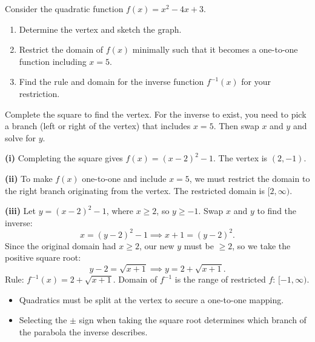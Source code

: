 
\begin{problem}
Consider the quadratic function $f(x) = x^2 - 4x + 3$.
\begin{enumerate}[label=(\roman*)]
\item Determine the vertex and sketch the graph.
\item Restrict the domain of $f(x)$ minimally such that it becomes a one-to-one function including $x=5$.
\item Find the rule and domain for the inverse function $f^{-1}(x)$ for your restriction.
\end{enumerate}
\end{problem}

\begin{hint}
Complete the square to find the vertex. For the inverse to exist, you need to pick a branch (left or right of the vertex) that includes $x=5$. Then swap $x$ and $y$ and solve for $y$.
\end{hint}

\begin{solution}
\textbf{(i)} Completing the square gives $f(x) = (x-2)^2 - 1$. The vertex is $(2, -1)$.

\textbf{(ii)} To make $f(x)$ one-to-one and include $x=5$, we must restrict the domain to the right branch originating from the vertex. The restricted domain is $[2, \infty)$.

\textbf{(iii)} Let $y = (x-2)^2 - 1$, where $x \ge 2$, so $y \ge -1$.
Swap $x$ and $y$ to find the inverse:
\[ x = (y-2)^2 - 1 \implies x + 1 = (y-2)^2. \]
Since the original domain had $x \ge 2$, our new $y$ must be $\ge 2$, so we take the positive square root:
\[ y-2 = \sqrt{x+1} \implies y = 2 + \sqrt{x+1}. \]
Rule: $\boxed{f^{-1}(x) = 2 + \sqrt{x+1}}$.
Domain of $f^{-1}$ is the range of restricted $f$: $\boxed{[-1, \infty)}$.
\end{solution}

\begin{takeaways}
\begin{itemize}[leftmargin=*]
\item Quadratics must be split at the vertex to secure a one-to-one mapping.
\item Selecting the $\pm$ sign when taking the square root determines which branch of the parabola the inverse describes.
\end{itemize}
\end{takeaways}

